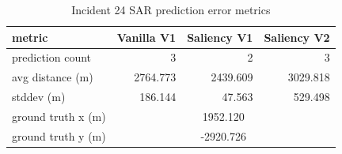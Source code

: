 \begin{table}[ht]
\centering
\caption{Incident 24 SAR prediction error metrics}
\label{tab:sar-incident-24}
\begin{tabular}{lrrr}
\hline
metric & Vanilla V1 & Saliency V1 & Saliency V2 \\
\hline
prediction count & 3 & 2 & 3 \\
avg distance (m) & 2764.773 & 2439.609 & 3029.818 \\
stddev (m) & 186.144 & 47.563 & 529.498 \\
ground truth x (m) & \multicolumn{3}{c}{1952.120} \\
ground truth y (m) & \multicolumn{3}{c}{-2920.726} \\
\hline
\end{tabular}
\end{table}
